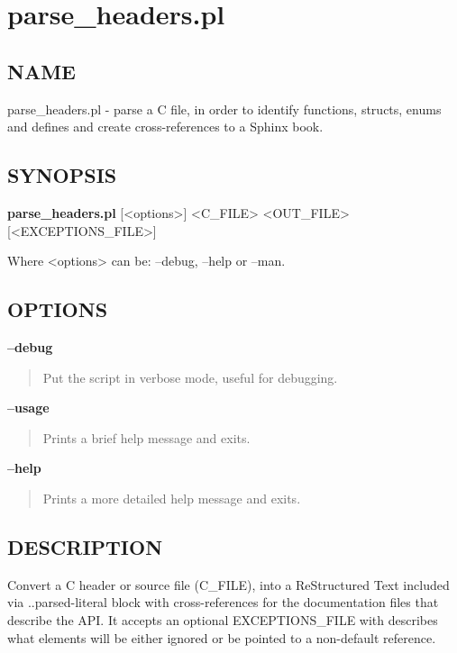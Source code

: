 \documentclass[a4paper,8pt,english]{sphinxmanual}
\begin{document}
\section{parse\_headers.pl}
\label{doc-guide/parse-headers:parse-headers}\label{doc-guide/parse-headers:parse-headers-pl}

\subsection{NAME}
\label{doc-guide/parse-headers:name}
parse\_headers.pl - parse a C file, in order to identify functions, structs,
enums and defines and create cross-references to a Sphinx book.


\subsection{SYNOPSIS}
\label{doc-guide/parse-headers:synopsis}
\textbf{parse\_headers.pl} {[}\textless{}options\textgreater{}{]} \textless{}C\_FILE\textgreater{} \textless{}OUT\_FILE\textgreater{} {[}\textless{}EXCEPTIONS\_FILE\textgreater{}{]}

Where \textless{}options\textgreater{} can be: --debug, --help or --man.


\subsection{OPTIONS}
\label{doc-guide/parse-headers:options}
\textbf{--debug}
\begin{quote}

Put the script in verbose mode, useful for debugging.
\end{quote}

\textbf{--usage}
\begin{quote}

Prints a brief help message and exits.
\end{quote}

\textbf{--help}
\begin{quote}

Prints a more detailed help message and exits.
\end{quote}


\subsection{DESCRIPTION}
\label{doc-guide/parse-headers:description}
Convert a C header or source file (C\_FILE), into a ReStructured Text
included via ..parsed-literal block with cross-references for the
documentation files that describe the API. It accepts an optional
EXCEPTIONS\_FILE with describes what elements will be either ignored or
be pointed to a non-default reference.
\end{document}
